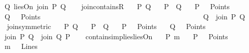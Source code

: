 \begin{isabellebody}
\ \ \ {\isachardoublequoteopen}Q\ liesOn\ {\isacharparenleft}{\kern0pt}join\ P\ Q{\isacharparenright}{\kern0pt}{\isachardoublequoteclose}\isanewline
%
\isadelimproof
\ \ %
\endisadelimproof
%
\isatagproof
{}\isamarkupfalse%
%
\endisatagproof
{\isafoldproof}%
%
\isadelimproof
\isanewline
%
\endisadelimproof
\isanewline
{}\isamarkupfalse%
\ join{\isacharunderscore}{\kern0pt}containsR{}{\isacharcolon}{\kern0pt}\isanewline
\ \ \ P\ Q\isanewline
\ \ \ {\isachardoublequoteopen}P\ {\isasymnoteq}\ Q{\isachardoublequoteclose}\isanewline
\ \ \ {\isachardoublequoteopen}P\ \ {\isasymin}\ Points{\isachardoublequoteclose}\isanewline
\ \ \ {\isachardoublequoteopen}Q\ \ {\isasymin}\ Points{\isachardoublequoteclose}\ \ \ \ \ \ \ \ \ \ \ \ \ \ \ \ \ \ \ \ \ \ \ \ \ \ \ \ \ \ \ \ \ \ \ \ \ \ \ \ \ \ \isanewline
\ \ \ {\isachardoublequoteopen}Q\ {\isasymlhd}\ {\isacharparenleft}{\kern0pt}join\ P\ Q{\isacharparenright}{\kern0pt}{\isachardoublequoteclose}\isanewline
%
\isadelimproof
\ \ %
\endisadelimproof
%
\isatagproof
{}\isamarkupfalse%
%
\endisatagproof
{\isafoldproof}%
%
\isadelimproof
\isanewline
%
\endisadelimproof
\isanewline
{}\isamarkupfalse%
\ join{\isacharunderscore}{\kern0pt}symmetric{}{\isacharcolon}{\kern0pt}\isanewline
\ \ \ P\ Q\isanewline
\ \ \ {\isachardoublequoteopen}P\ {\isasymnoteq}\ Q{\isachardoublequoteclose}\isanewline
\ \ \ {\isachardoublequoteopen}P\ \ {\isasymin}\ Points{\isachardoublequoteclose}\isanewline
\ \ \ {\isachardoublequoteopen}Q\ \ {\isasymin}\ Points{\isachardoublequoteclose}\isanewline
\ \ \ {\isachardoublequoteopen}join\ P\ Q\ {\isacharequal}{\kern0pt}\ join\ Q\ P{\isachardoublequoteclose}\isanewline
%
\isadelimproof
\ \ %
\endisadelimproof
%
\isatagproof
{}\isamarkupfalse%
%
\endisatagproof
{\isafoldproof}%
%
\isadelimproof
\isanewline
%
\endisadelimproof
\isanewline
{}\isamarkupfalse%
\ contains{\isacharunderscore}{\kern0pt}implies{\isacharunderscore}{\kern0pt}liesOn{\isacharcolon}{\kern0pt}\isanewline
\ \ \ P\ m\isanewline
\ \ \ {\isachardoublequoteopen}P\ \ {\isasymin}\ Points{\isachardoublequoteclose}\isanewline
\ \ \ {\isachardoublequoteopen}m\ \ {\isasymin}\ Lines{\isachardoublequoteclose}\isanewline

\end{isabellebody}
